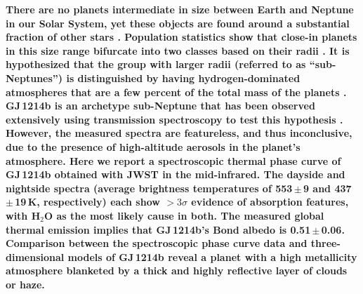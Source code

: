 \documentclass[pdflatex,sn-standardnature]{sn-jnl}%
\begin{document}
\textbf{There are no planets intermediate in size between Earth and Neptune in our Solar System, yet these objects are found around a substantial fraction of other stars \cite{howard12}. Population statistics show that close-in planets in this size range bifurcate into two classes based on their radii \cite{fulton17,vaneylen18}. It is hypothesized that the group with larger radii (referred to as ``sub-Neptunes'') is distinguished by having hydrogen-dominated atmospheres that are a few percent of the total mass of the planets \cite{bean21}. GJ\,1214b is an archetype sub-Neptune that has been observed extensively using transmission spectroscopy to test this hypothesis \cite{bean10, croll11, bean11, desert11, berta12, fraine13, kreidberg14, kasper20, orell22, spake22}. However, the measured spectra are featureless, and thus inconclusive, due to the presence of high-altitude aerosols in the planet’s atmosphere. Here we report a spectroscopic thermal phase curve of GJ\,1214b obtained with JWST in the mid-infrared. The dayside and nightside spectra (average brightness temperatures of 553\,$\pm$\,9 and 437 $\pm$\,19\,K, respectively) each show $>3\sigma$ evidence of absorption features, with H$_2$O as the most likely cause in both. The measured global thermal emission implies that GJ\,1214b's Bond albedo is 0.51\,$\pm$\,0.06. Comparison between the spectroscopic phase curve data and three-dimensional models of GJ\,1214b reveal a planet with a high metallicity atmosphere blanketed by a thick and highly reflective layer of clouds or haze.}



\end{document}
